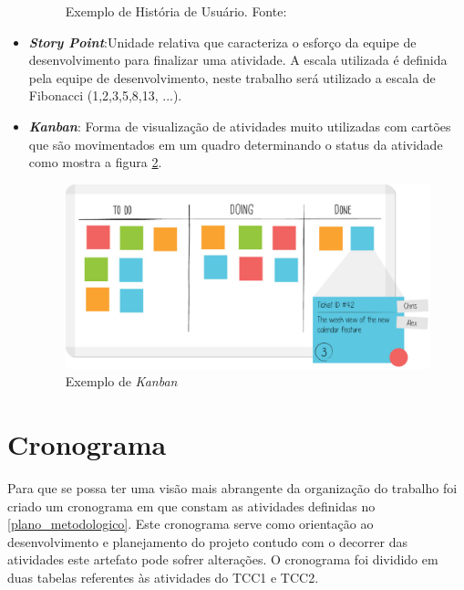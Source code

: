 \begin{itemize}
\begin{figure}[h]
\caption{Exemplo de História de Usuário. Fonte: \cite{sabbagh_scrum:_2014}}
\label{img:us}
\end{figure}
\item \textit{\textbf{Story Point}}:Unidade relativa que caracteriza o esforço da equipe de desenvolvimento para finalizar uma atividade. A escala utilizada é definida pela equipe de desenvolvimento, neste trabalho será utilizado a escala de Fibonacci (1,2,3,5,8,13, ...). 
\item \textit{\textbf{Kanban}}: Forma de visualização de atividades muito utilizadas com cartões que são movimentados em um quadro determinando o status da atividade como mostra a figura \ref{img:kanban}.
\graphicspath{{figuras/}}
\begin{figure}[h]
\centering
\includegraphics[scale=0.40]{kanban}
\caption{Exemplo de \textit{Kanban}}
\label{img:kanban}
\end{figure}

\end{itemize}
\section{Cronograma}
\label{cronograma}
Para que se possa ter uma visão mais abrangente da organização do trabalho foi criado um cronograma em que constam as atividades definidas no \ref{plano_metodologico}. Este cronograma serve como orientação ao desenvolvimento e planejamento do projeto contudo com o decorrer das atividades este artefato pode sofrer alterações. O cronograma foi dividido em duas tabelas referentes às atividades do TCC1 e TCC2.

